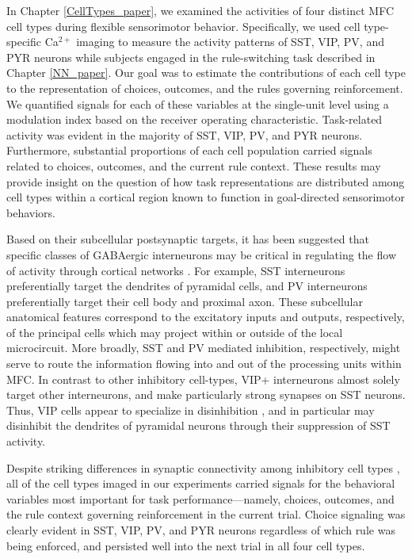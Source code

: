 
In Chapter \ref{CellTypes_paper}, we examined the activities of four distinct MFC cell types during flexible sensorimotor behavior. Specifically, we used cell type-specific Ca$^{2+}$ imaging to measure the activity patterns of SST, VIP, PV, and PYR neurons while subjects engaged in the rule-switching task described in Chapter \ref{NN_paper}. Our goal was to estimate the contributions of each cell type to the representation of choices, outcomes, and the rules governing reinforcement. We quantified signals for each of these variables at the single-unit level using a modulation index based on the receiver operating characteristic. Task-related activity was evident in the majority of SST, VIP, PV, and PYR neurons. Furthermore, substantial proportions of each cell population carried signals related to choices, outcomes, and the current rule context. These results may provide insight on the question of how task representations are distributed among cell types within a cortical region known to function in goal-directed sensorimotor behaviors.

Based on their subcellular postsynaptic targets, it has been suggested that specific classes of GABAergic interneurons may be critical in regulating the flow of activity through cortical networks \citep{kepecs2014interneuron}. For example, SST interneurons preferentially target the dendrites of pyramidal cells, and PV interneurons preferentially target their cell body and proximal axon. These subcellular anatomical features correspond to the excitatory inputs and outputs, respectively, of the principal cells which may project within or outside of the local microcircuit. More broadly, SST and PV mediated inhibition, respectively, might serve to route the information flowing into and out of the processing units within MFC. In contrast to other inhibitory cell-types, VIP+ interneurons almost solely target other interneurons, and make particularly strong synapses on SST neurons. Thus, VIP cells appear to specialize in disinhibition \citep{letzkus2011disinhibitory,pi13,karnani2016opening}, and in particular may disinhibit the dendrites of pyramidal neurons through their suppression of SST activity.  

Despite striking differences in synaptic connectivity among inhibitory cell types \citep{kepecs2014interneuron}, all of the cell types imaged in our experiments carried signals for the behavioral variables most important for task performance---namely, choices, outcomes, and the rule context governing reinforcement in the current trial. Choice signaling was clearly evident in SST, VIP, PV, and PYR neurons regardless of which rule was being enforced, and persisted well into the next trial in all four cell types. 

